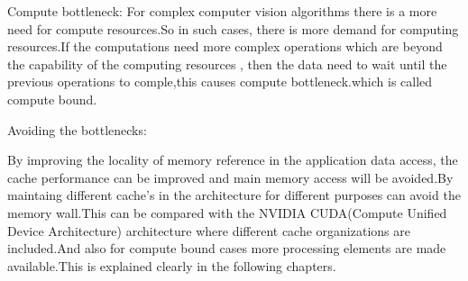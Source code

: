 Compute bottleneck:
For complex computer vision algorithms there is a more need for compute resources.So in such cases, there is more demand for computing resources.If the computations need more complex operations which are beyond the capability of the computing resources , then the data need to wait until the previous operations to comple,this causes compute bottleneck.which is called compute bound.

Avoiding the bottlenecks:

By improving the locality of memory reference in the application data access, the cache performance  can be improved and main memory access will be avoided.By maintaing different cache's in the architecture for different purposes can avoid the memory wall.This can be compared with the NVIDIA CUDA(Compute Unified Device Architecture) architecture where different cache organizations are included.And also for  compute bound cases more processing elements  are made available.This is explained clearly in the following chapters.

